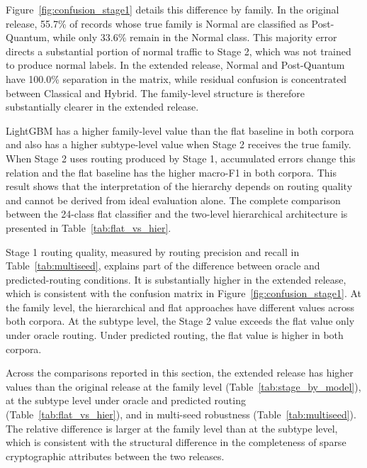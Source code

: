 \documentclass{IEEEoj}
\begin{document}


Figure~\ref{fig:confusion_stage1} details this difference by family. In the
original release, 55.7\% of records whose true family is Normal are classified
as Post-Quantum, while only 33.6\% remain in the Normal class. This majority
error directs a substantial portion of normal traffic to Stage 2, which was
not trained to produce normal labels. In the extended release, Normal and
Post-Quantum have 100.0\% separation in the matrix, while residual confusion
is concentrated between Classical and Hybrid. The family-level structure is
therefore substantially clearer in the extended release.

LightGBM has a higher family-level value than the flat baseline in both corpora
and also has a higher subtype-level value when Stage 2 receives the true
family. When Stage 2 uses routing produced by Stage 1, accumulated errors
change this relation and the flat baseline has the higher macro-F1 in both
corpora. This result shows that the interpretation of the hierarchy depends on
routing quality and cannot be derived from ideal evaluation alone. The complete
comparison between the 24-class flat classifier and the two-level hierarchical
architecture is presented in Table~\ref{tab:flat_vs_hier}.



Stage 1 routing quality, measured by routing precision and recall in
Table~\ref{tab:multiseed}, explains part of the difference between oracle and
predicted-routing conditions. It is substantially higher in the extended release, which is
consistent with the confusion matrix in Figure~\ref{fig:confusion_stage1}. At
the family level, the hierarchical and flat approaches have different values
across both corpora. At the subtype level, the Stage 2 value exceeds the flat
value only under oracle routing. Under predicted routing, the flat value is
higher in both corpora.

Across the comparisons reported in this section, the extended release has
higher values than the original release at the family level
(Table~\ref{tab:stage_by_model}), at the subtype level under oracle and predicted
routing (Table~\ref{tab:flat_vs_hier}), and in multi-seed robustness
(Table~\ref{tab:multiseed}). The relative difference is larger at the family
level than at the subtype level, which is consistent with the structural
difference in the completeness of sparse cryptographic attributes between the
two releases.
\end{document}
